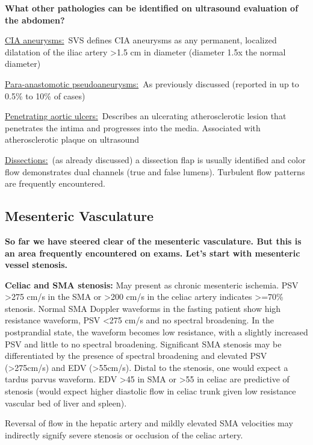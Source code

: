 \documentclass[
]{book}
\begin{document}
\textbf{What other pathologies can be identified on ultrasound evaluation of
the abdomen?}

\uline{CIA aneurysms:}~SVS defines CIA aneurysms as any permanent,
localized dilatation of the iliac artery \textgreater1.5 cm in diameter (diameter
1.5x the normal diameter)

\uline{Para-anastomotic pseudoaneurysms:}~As previously discussed
(reported in up to 0.5\% to 10\% of cases)

\uline{Penetrating aortic ulcers:}~Describes an ulcerating
atherosclerotic lesion that penetrates the intima and progresses into
the media. Associated with atherosclerotic plaque on ultrasound

\uline{Dissections:}~(as already discussed) a dissection flap is
usually identified and color flow demonstrates dual channels (true and
false lumens). Turbulent flow patterns are frequently encountered.

\hypertarget{mesenteric-vasculature}{%
\subsection{Mesenteric Vasculature}\label{mesenteric-vasculature}}

\textbf{So far we have steered clear of the mesenteric vasculature. But this
is an area frequently encountered on exams. Let's start with mesenteric
vessel stenosis.}

\textbf{Celiac and SMA stenosis:} May present as chronic mesenteric ischemia.
PSV \textgreater275 cm/s in the SMA or \textgreater200 cm/s in the celiac artery indicates
\textgreater=70\% stenosis. Normal SMA Doppler waveforms in the fasting patient
show high resistance waveform, PSV \textless275 cm/s and no spectral
broadening. In the postprandial state, the waveform becomes low
resistance, with a slightly increased PSV and little to no spectral
broadening. Significant SMA stenosis may be differentiated by the
presence of spectral broadening and elevated PSV (\textgreater275cm/s) and EDV
(\textgreater55cm/s).\citep{aburahma2012, oderich2019} Distal to the stenosis, one
would expect a tardus parvus waveform. EDV \textgreater45 in SMA or \textgreater55 in celiac
are predictive of stenosis (would expect higher diastolic flow in celiac
trunk given low resistance vascular bed of liver and spleen).

Reversal of flow in the hepatic artery and mildly elevated SMA
velocities may indirectly signify severe stenosis or occlusion of the
celiac artery.
\end{document}
